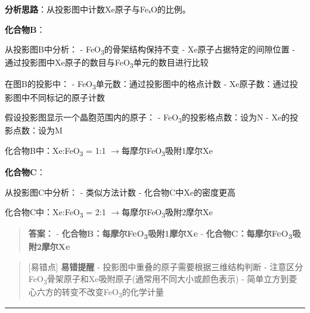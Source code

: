 \documentclass[a4paper,11pt]{ctexart}
\newcommand{\箭}{\ensuremath{\rightarrow}}
\newcommand{\左箭}{\ensuremath{\leftarrow}}
\newcommand{\上箭}{\ensuremath{\uparrow}}
\newcommand{\下箭}{\ensuremath{\downarrow}}
\newcommand{\衡}{\ensuremath{\rightleftharpoons}}
\newcommand{\双箭}{\ensuremath{\leftrightarrow}}
\newcommand{\约等于}{\ensuremath{\approx}}
\newcommand{\小于等于}{\ensuremath{\leq}}
\newcommand{\大于等于}{\ensuremath{\geq}}
\newcommand{\不等于}{\ensuremath{\neq}}
\newcommand{\西格马}{\ensuremath{\sigma}}
\newcommand{\派}{\ensuremath{\pi}}
\begin{document}
\textbf{分析思路}：从投影图中计数Xe原子与FeₓO的比例。

\textbf{化合物B}：

从投影图B中分析：
- FeO\textsubscript{3}的骨架结构保持不变
- Xe原子占据特定的间隙位置
- 通过投影图中Xe原子的数目与FeO\textsubscript{3}单元的数目进行比较

在图B的投影中：
- FeO\textsubscript{3}单元数：通过投影图中的格点计数
- Xe原子数：通过投影图中不同标记的原子计数

假设投影图显示一个晶胞范围内的原子：
- FeO\textsubscript{3}的投影格点数：设为N
- Xe的投影点数：设为M

化合物B中：Xe:FeO\textsubscript{3} = 1:1 \箭 每摩尔FeO\textsubscript{3}吸附1摩尔Xe

\textbf{化合物C}：

从投影图C中分析：
- 类似方法计数
- 化合物C中Xe的密度更高

化合物C中：Xe:FeO\textsubscript{3} = 2:1 \箭 每摩尔FeO\textsubscript{3}吸附2摩尔Xe

\begin{quote}
\textbf{答案：}
- \textbf{化合物B：每摩尔FeO\textsubscript{3}吸附1摩尔Xe}
- \textbf{化合物C：每摩尔FeO\textsubscript{3}吸附2摩尔Xe}
\end{quote}

\begin{quote}
{[}易错点{]} \textbf{易错提醒}
- 投影图中重叠的原子需要根据三维结构判断
- 注意区分FeO\textsubscript{3}骨架原子和Xe吸附原子(通常用不同大小或颜色表示)
- 简单立方到菱心六方的转变不改变FeO\textsubscript{3}的化学计量
\end{quote}

\begin{center}\rule{0.5\linewidth}{0.5pt}\end{center}
\end{document}
